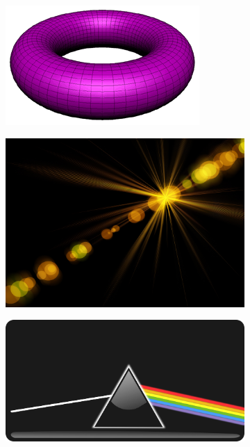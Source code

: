 {
	\begin{figure}
		\centering
		\begin{subfigure}{\textwidth}
			\centering
			\includegraphics[width=\textwidth, height=0.3\textheight, keepaspectratio]{images/primitive_torus}
		\end{subfigure}
		\begin{subfigure}{\textwidth}
			\centering
			\includegraphics[width=\textwidth, height=0.3\textheight, keepaspectratio]{images/bokeh-419869}
		\end{subfigure}
		\begin{subfigure}{\textwidth}
			\centering
			\includegraphics[width=\textwidth, height=0.3\textheight, keepaspectratio]{images/refraction-150853}
		\end{subfigure}
	\end{figure}
}

